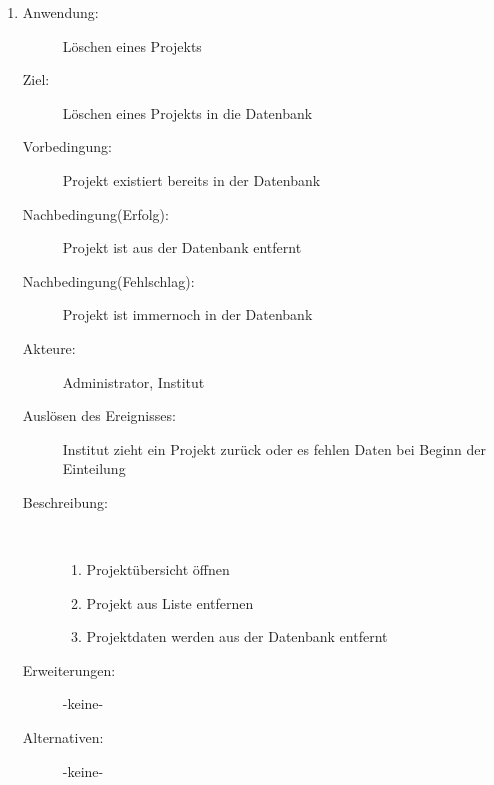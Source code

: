 \documentclass[parskip=full]{scrartcl}
\newcommand{\swtLabel}[1]{\textbf{/#1\arabic*0/}}
\begin{document}
\begin{enumerate} [label=\swtLabel{A}]
  
  \item
  \begin{description}
  \item[Anwendung:] Löschen eines Projekts
  \item[Ziel:] Löschen eines Projekts in die Datenbank
  	\item[Vorbedingung:] Projekt existiert bereits in der Datenbank
  	\item[Nachbedingung(Erfolg):] Projekt ist aus der Datenbank entfernt
  	\item[Nachbedingung(Fehlschlag):] Projekt ist immernoch in der Datenbank
  	\item[Akteure:] Administrator, Institut
  	\item[Auslösen des Ereignisses:] Institut zieht ein Projekt zurück oder es
  	fehlen Daten bei Beginn der Einteilung
  	\item[Beschreibung:]~
  	\begin{enumerate} 
  	  \item Projektübersicht öffnen
  	  \item Projekt aus Liste entfernen
  	  \item Projektdaten werden aus der Datenbank entfernt
  	\end{enumerate}
  	\item[Erweiterungen:] -keine-
  	\item[Alternativen:] -keine-
  \end{description}
   

\end{enumerate}
\end{document}
